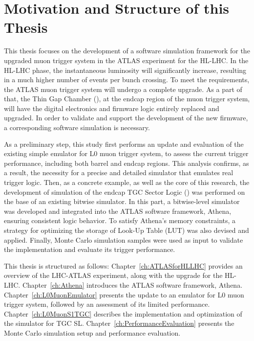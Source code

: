 \section{Motivation and Structure of this Thesis} \label{sec:motivation}
This thesis focuses on the development of a software simulation framework for the upgraded muon trigger system in the ATLAS experiment for the HL-LHC. In the HL-LHC phase, the instantaneous luminosity will significantly increase, resulting in a much higher number of events per bunch crossing. To meet the requirements, the ATLAS muon trigger system will undergo a complete upgrade. As a part of that, the Thin Gap Chamber (\TGC), at the endcap region of the muon trigger system, will have the digital electronics and firmware logic entirely replaced and upgraded. In order to validate and support the development of the new firmware, a corresponding software simulation is necessary. 

As a preliminary step, this study first performs an update and evaluation of the existing simple emulator for L0 muon trigger system, to assess the current trigger performance, including both barrel and endcap regions. This analysis confirms, as a result, the necessity for a precise and detailed simulator that emulates real trigger logic. Then, as a concrete example, as well as the core of this research, the development of simulation of the endcap TGC Sector Logic (\SL) was performed on the base of an existing bitwise simulator. In this part, a bitwise-level simulator was developed and integrated into the ATLAS software framework, Athena, ensuring consistent logic behavior. To satisfy Athena’s memory constraints, a strategy for optimizing the storage of Look-Up Table (LUT) was also devised and applied. Finally, Monte Carlo simulation samples were used as input to validate the implementation and evaluate its trigger performance.

This thesis is structured as follows: Chapter~\ref{ch:ATLASforHLLHC} provides an overview of the LHC-ATLAS experiment, along with the upgrade for the HL-LHC. Chapter~\ref{ch:Athena} introduces the ATLAS software framework, Athena. Chapter~\ref{ch:L0MuonEmulator} presents the update to an emulator for L0 muon trigger system, followed by an assessment of its limited performance. Chapter~\ref{ch:L0MuonS1TGC} describes the implementation and optimization of the simulator for TGC SL. Chapter~\ref{ch:PerformanceEvaluation} presents the Monte Carlo simulation setup and performance evaluation.